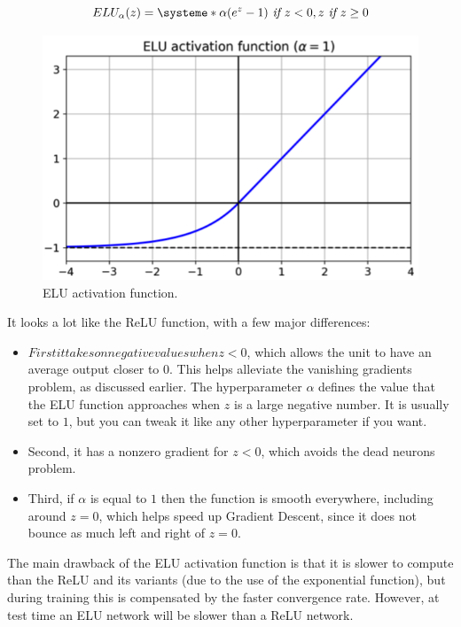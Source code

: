 \begin{equation}
ELU_\alpha(z) = \systeme*{\alpha(e^z - 1) \textit{ if } {z<0} ,z \textit{ if } {z\ge 0}}
\end{equation}
\begin{figure}
\centering
\includegraphics[scale=0.4]{img/ELU}
\caption{ELU activation function.}
\end{figure}
It looks a lot like the ReLU function, with a few major differences:
\begin{itemize}
\item$ First it takes on negative values when z < 0$, which allows the unit to have an average output closer to $0$. This helps alleviate the vanishing gradients problem, as discussed earlier. The hyperparameter $\alpha$ defines the value that the ELU function approaches when $z$ is a large negative number. It is usually set to $1$, but you can tweak it like any other hyperparameter if you want.
\item Second, it has a nonzero gradient for $z < 0$, which avoids the dead neurons problem.
\item Third, if $\alpha$ is equal to $1$ then the function is smooth everywhere, including around $z = 0$, which helps speed up Gradient Descent, since it does not bounce as much left and right of $z = 0$.
\end{itemize}
The main drawback of the ELU activation function is that it is slower to compute than the ReLU and its variants (due to the use of the exponential function), but during training this is compensated by the faster convergence rate. However, at test time an ELU network will be slower than a ReLU network.

